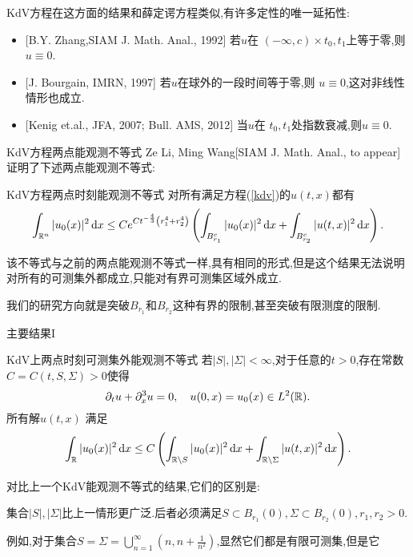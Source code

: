 \begin{frame}[t]
  KdV方程在这方面的结果和薛定谔方程类似,有许多定性的唯一延拓性:
  \begin{itemize}
    \item {}[B.Y. Zhang,SIAM J. Math. Anal., 1992] 若$u$在 $(-\infty,c)\times {t_0,t_1}$上等于零,则$u\equiv 0$.
    \item {}[J. Bourgain, IMRN, 1997] 若$u$在球外的一段时间等于零,则 $u\equiv 0$,这对非线性情形也成立.
    \item {}[Kenig et.al., JFA, 2007; Bull. AMS, 2012] 当$u$在 $t_0,t_1$处指数衰减,则$u\equiv 0$.
  \end{itemize}
\end{frame}
\begin{frame}[t]{KdV方程两点能观测不等式}
  Ze Li, Ming Wang[SIAM J. Math. Anal., to appear]证明了下述两点能观测不等式:
  \begin{alertblock}{KdV方程两点时刻能观测不等式} 
    对所有满足方程(\ref{kdv})的$u(t,x)$都有
  \begin{equation}
    \int_{\mathbb{R}^{n}}|u_0(x)|^2\,\mathrm{d}x\le Ce^{Ct ^{-\frac{4}{3}}\left(r_1^4+r_2^4\right)}\left( \int_{B_{r_1}^c}|u_0(x)|^2\,\mathrm{d}x+\int_{B_{r_2}^c}|u(t,x)|^2 \,\mathrm{d}x \right).\label{kdv-obs-old}
  \end{equation}
\end{alertblock}
  该不等式与之前的两点能观测不等式一样,具有相同的形式,但是这个结果无法说明对所有的可测集外都成立,只能对有界可测集区域外成立.
  
  我们的研究方向就是突破$B_{r_1}$和$B_{r_2}$这种有界的限制,甚至突破有限测度的限制. 
\end{frame}
\begin{frame}[t]{主要结果I}
  \begin{alertblock}{KdV上两点时刻可测集外能观测不等式}
    若$|S|,|\Sigma|<\infty$,对于任意的$t>0$,存在常数 $C=C(t,S,\Sigma)>0$使得
    \[ 
    \partial_t u +\partial_x^3u=0,\quad u(0,x)=u_0(x)\in L^2(\mathbb{R}).
    \] 
    所有解$u(t,x)$ 满足
  \begin{equation}\label{obkdv}
    \int_{\mathbb{R}}|u_0(x)|^2\,\mathrm{d}x\le C \left( \int_{\mathbb{R}\setminus S}|u_0(x)|^2\,\mathrm{d}x + \int_{\mathbb{R}\setminus \Sigma} |u(t,x)|^2\,\mathrm{d}x  \right). 
  \end{equation}
  \end{alertblock}
  对比上一个KdV能观测不等式的结果,它们的区别是:
  \begin{alertblock}{}
    集合$|S|,|\Sigma|$比上一情形更广泛.后者必须满足$S\subset B_{r_1}(0),\Sigma\subset B_{r_2}(0),r_1,r_2>0$.
  \end{alertblock}
  例如,对于集合$S=\Sigma=\bigcup_{n=1}^\infty \left(n,n+\frac{1}{n^2}\right)$,显然它们都是有限可测集,但是它
\end{frame}


